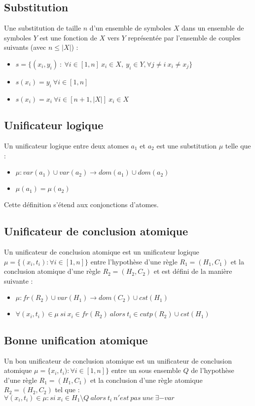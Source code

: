 \subsection{Substitution}
	Une substitution de taille $n$ d'un ensemble de symboles $X$ dans un ensemble de symboles $Y$ est une fonction de $X$ 
	vers $Y$ repr\'esent\'ee par l'ensemble de couples suivants (avec $n \leq |X|$) :
	\begin{itemize}
		\item $s = \{(x_{i},y_{i})\ :\ \forall i \in [1,n]\ x_{i} \in X,\ y_{i} \in Y, \forall j \neq i\ x_{i} \neq x_{j}\}$
		\item $s(x_{i}) = y_{i}\ \forall i \in [1,n]$
		\item $s(x_{i}) = x_{i}\ \forall i \in [n+1,|X|]\ x_{i} \in X$
	\end{itemize}

\subsection{Unificateur logique}
	Un unificateur logique entre deux atomes $a_{1}$ et $a_{2}$ est une substitution $\mu$ telle que :
	\begin{itemize}
		\item $\mu : var(a_{1}) \cup var(a_{2}) \rightarrow dom(a_{1}) \cup dom(a_{2})$
		\item $\mu(a_{1}) = \mu(a_{2})$
	\end{itemize}
	Cette d\'efinition s'\'etend aux conjonctions d'atomes.

\subsection{Unificateur de conclusion atomique}
	Un unificateur de conclusion atomique est un unificateur logique $\mu = \{(x_{i},t_{i}) : \forall i \in [1,n]\}$
	entre l'hypoth\`ese d'une r\`egle $R_{1} = (H_{1},C_{1})$ et la conclusion atomique d'une r\`egle $R_{2} = (H_{2},C_{2})$ et est d\'efini de la mani\`ere suivante :
	\begin{itemize}
		\item $\mu : fr(R_{2}) \cup var(H_{1}) \rightarrow dom(C_{2}) \cup cst(H_{1})$
		\item $\forall (x_{i},t_{i}) \in \mu\ si\ x_{i} \in fr(R_{2})\ alors\ t_{i} \in cutp(R_{2}) \cup cst(H_{1})$
	\end{itemize}
    
\subsection{Bonne unification atomique}
	Un bon unificateur de conclusion atomique est un unificateur de conclusion atomique $\mu = \{x_{i},t_{i}) : \forall i \in [1,n]\}$
	entre un sous ensemble $Q$ de l'hypoth\`ese d'une r\`egle $R_{1} = (H_{1},C_{1})$ et la conclusion d'une r\`egle atomique
	$R_{2} = (H_{2},C_{2})$ tel que :\\
	$\forall (x_{i},t_{i}) \in \mu : si\ x_{i} \in H_{1} \setminus Q\ alors\ t_{i}\ n'est\ pas\ une\ \exists-var$

